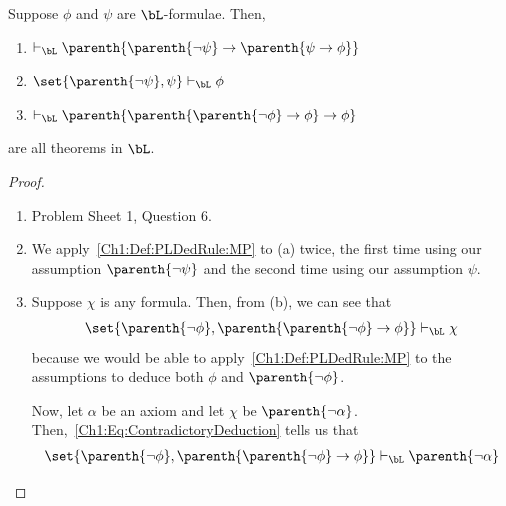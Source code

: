 \begin{boxexample}
    Suppose $\phi$ and $\psi$ are $\bL$-formulae. Then,
    \begin{enumerate}[label = \normalfont (\alph*)]
        \item $\vdash_{\bL} \parenth{\parenth{\neg \psi} \to \parenth{\psi \to \phi}}$
        \item $\set{\parenth{\neg \psi}, \psi} \vdash_{\bL} \phi$
        \item $\vdash_{\bL} \parenth{\parenth{\parenth{\neg \phi} \to \phi} \to \phi}$
    \end{enumerate}
    are all theorems in $\bL$.
    \begin{proof}
        \hfill
        \begin{enumerate}[label = (\alph*)]
            \item Problem Sheet 1, Question 6. \sorry
            
            \item We apply~\ref{Ch1:Def:PLDedRule:MP} to (a) twice, the first time using our assumption $\parenth{\neg \psi}$ and the second time using  our assumption $\psi$.
            
            \item Suppose $\chi$ is any formula. Then, from (b), we can see that
            \begin{align}
                \set{\parenth{\neg \phi}, \parenth{\parenth{\neg \phi} \to \phi}} \vdash_{\bL} \chi
                \label{Ch1:Eq:ContradictoryDeduction}
            \end{align}
            because we would be able to apply~\ref{Ch1:Def:PLDedRule:MP} to the assumptions to deduce both $\phi$ and $\parenth{\neg \phi}$.
            
            Now, let $\alpha$ be an axiom and let $\chi$ be $\parenth{\neg \alpha}$. Then,~\eqref{Ch1:Eq:ContradictoryDeduction} tells us that
            \begin{align*}
                \set{\parenth{\neg \phi}, \parenth{\parenth{\neg \phi} \to \phi}} \vdash_{\bL} \parenth{\neg \alpha}
            \end{align*}
            \sorry %
        \end{enumerate}
    \end{proof}
\end{boxexample}
